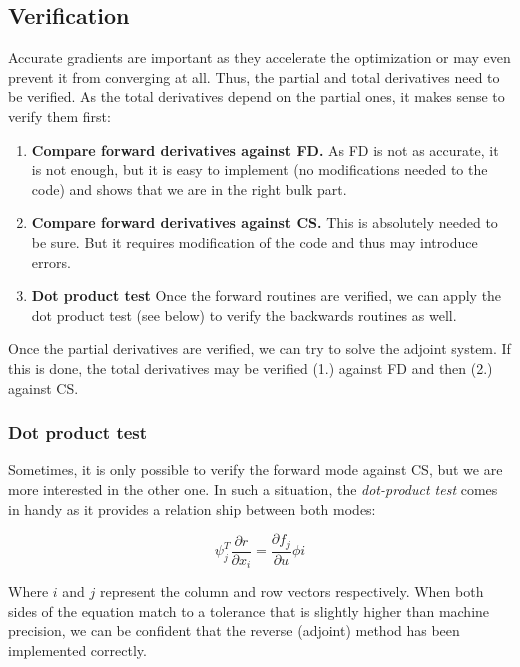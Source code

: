\subsection{Verification}
Accurate gradients are important as they accelerate the optimization or may
even prevent it from converging at all. Thus, the partial and total derivatives
need to be verified. As the total derivatives depend on the partial ones, it
makes sense to verify them first:

\begin{enumerate}
    \item \textbf{Compare forward derivatives against FD.} As FD is not as
        accurate, it is not enough, but it is easy to implement (no
        modifications needed to the code) and shows that we are in the right
        bulk part.
    \item \textbf{Compare forward derivatives against CS.} This is absolutely
        needed to be sure. But it requires modification of the code and thus
        may introduce errors.

    \item \textbf{Dot product test} Once the forward routines are verified, we
        can apply the dot product test (see below) to verify the backwards
        routines as well.
\end{enumerate}

\noindent Once the partial derivatives are verified, we can try to solve the
adjoint system. If this is done, the total derivatives may be verified (1.)
against FD and then (2.) against CS.

\subsubsection{Dot product test}
Sometimes, it is only possible to verify the forward mode against CS, but we
are more interested in the other one. In such a situation, the
\textit{dot-product test} comes in handy as it provides a relation ship between
both modes:

\begin{equation}
    \psi_j^T \frac{\partial r}{\partial x_i} = 
    \frac{\partial f_j}{\partial u} \phi i
\end{equation}

\noindent Where $i$ and $j$ represent the column and row vectors respectively.
When both sides of the equation match to a tolerance that is slightly higher
than machine precision, we can be confident that the reverse (adjoint) method
has been implemented correctly.\cite{mdobook}




